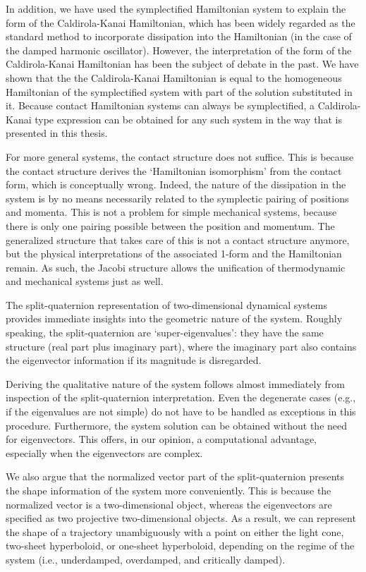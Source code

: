 In addition, we have used the symplectified Hamiltonian system to explain the form of the Caldirola-Kanai Hamiltonian, which has been widely regarded as the standard method to incorporate dissipation into the Hamiltonian (in the case of the damped harmonic oscillator). However, the interpretation of the form of the Caldirola-Kanai Hamiltonian has been the subject of debate in the past. We have shown that the the Caldirola-Kanai Hamiltonian is equal to the homogeneous Hamiltonian of the symplectified system with part of the solution substituted in it.
Because contact Hamiltonian systems can always be symplectified, a Caldirola-Kanai type expression can be obtained for any such system in the way that is presented in this thesis.

For more general systems, the contact structure does not suffice. This is because the contact structure derives the `Hamiltonian isomorphism' from the contact form, which is conceptually wrong. Indeed, the nature of the dissipation in the system is by no means necessarily related to the symplectic pairing of positions and momenta. This is not a problem for simple mechanical systems, because there is only one pairing possible between the position and momentum. The generalized structure that takes care of this is not a contact structure anymore, but the physical interpretations of the associated 1-form and the Hamiltonian remain. As such, the Jacobi structure allows the unification of thermodynamic and mechanical systems just as well.

The split-quaternion representation of two-dimensional dynamical systems provides immediate insights into the geometric nature of the system. Roughly speaking, the split-quaternion are `super-eigenvalues': they have the same structure (real part plus imaginary part), where the imaginary part also contains the eigenvector information if its magnitude is disregarded.

Deriving the qualitative nature of the system follows almost immediately from inspection of the split-quaternion interpretation. Even the degenerate cases (e.g., if the eigenvalues are not simple) do not have to be handled as exceptions in this procedure. 
Furthermore, the system solution can be obtained without the need for eigenvectors. This offers, in our opinion, a computational advantage, especially when the eigenvectors are complex.

We also argue that the normalized vector part of the split-quaternion presents the shape information of the system more conveniently. This is because the normalized vector is a two-dimensional object, whereas the eigenvectors are specified as two projective two-dimensional objects. As a result, we can represent the shape of a trajectory unambiguously with a point on either the light cone, two-sheet hyperboloid, or one-sheet hyperboloid, depending on the regime of the system (i.e., underdamped, overdamped, and critically damped).

